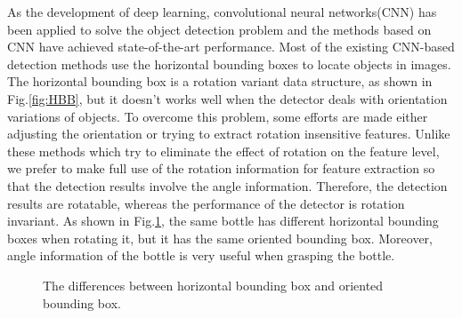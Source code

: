 As the development of deep learning, convolutional neural networks(CNN) has been applied to solve the object detection problem and the methods based on CNN have achieved state-of-the-art performance\cite{DRBox}. Most of the existing CNN-based detection methods use the horizontal bounding boxes to locate objects in images. The horizontal bounding box is a rotation variant data structure, as shown in Fig.\ref{fig:HBB}, but it doesn't works well when the detector deals with orientation variations of objects. To overcome this problem, some efforts are made either adjusting the orientation or trying to extract rotation insensitive features. Unlike these methods which try to eliminate the effect of rotation on the feature level, we prefer to make full use of the rotation information for feature extraction so that the detection results involve the angle information. Therefore, the detection results are rotatable, whereas the performance of the detector is rotation invariant\cite{DRBox}. As shown in Fig.\ref{fig:HBB_and_OBB}, the same bottle has different horizontal bounding boxes when rotating it, but it has the same oriented bounding box. Moreover, angle information of the bottle is very useful when grasping the bottle.

\begin{figure}
	\centering
	
	\caption{The differences between horizontal bounding box and oriented bounding box.}
	\label{fig:HBB_and_OBB}
\end{figure}